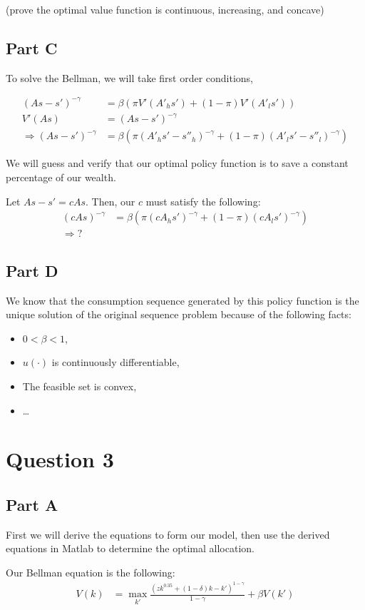 \documentclass[11pt]{article} %
\begin{document}
(prove the optimal value function is continuous, increasing, and concave)


\subsection{Part C}
To solve the Bellman, we will take first order conditions, 

\begin{align*}
(As - s')^{-\gamma}&= \beta(\pi V'(A'_hs') + (1-\pi)V'(A'_l s'))\\
V'(As) &= (As -s')^{-\gamma}\\
\Rightarrow (As - s')^{-\gamma}&= \beta(\pi (A'_hs'-s''_h)^{-\gamma} + (1-\pi)(A'_l s'-s''_l)^{-\gamma})
\end{align*}

We will guess and verify that our optimal policy function is to save a constant percentage of our wealth.

Let $As-s' = cAs$. Then, our $c$ must satisfy the following:
\begin{align*}
(cAs)^{-\gamma} &= \beta(\pi (cA_hs')^{-\gamma} + (1-\pi)(cA_ls')^{-\gamma} )\\
\Rightarrow ?
\end{align*}

\subsection{Part D}
We know that the consumption sequence generated by this policy function is the unique solution of the original sequence problem because of the following facts:
\begin{itemize}
\item $0<\beta<1$,
\item $u(\cdot)$ is continuously differentiable,
\item The feasible set is convex,
\item \dots
\end{itemize}
\section{Question 3}
\subsection{Part A}
First we will derive the equations to form our model, then use the derived equations in Matlab to determine the optimal allocation.

Our Bellman equation is the following:
\begin{align*}
V(k) &= \max_{k'} \frac{(zk^{0.35} + (1-\delta)k - k')^{1-\gamma}}{1-\gamma} +\beta V(k')
\end{align*}
\end{document}
